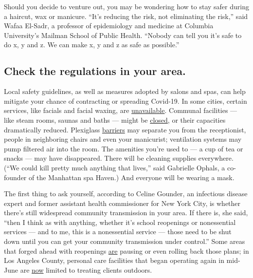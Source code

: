 Should you decide to venture out, you may be wondering how to stay safer
during a haircut, wax or manicure. ``It's reducing the risk, not
eliminating the risk,'' said Wafaa El-Sadr, a professor of epidemiology
and medicine at Columbia University's Mailman School of Public Health.
``Nobody can tell you it's safe to do x, y and z. We can make x, y and z
as safe as possible.''

\hypertarget{check-the-regulations-in-your-area}{%
\subsection{Check the regulations in your
area.}\label{check-the-regulations-in-your-area}}

Local safety guidelines, as well as measures adopted by salons and spas,
can help mitigate your chance of contracting or spreading Covid-19. In
some cities, certain services, like facials and facial waxing, are
\href{https://www.governor.ny.gov/sites/governor.ny.gov/files/atoms/files/Personal_Care_Summary_Guidelines.pdf}{unavailable}.
Communal facilities --- like steam rooms, saunas and baths --- might be
\href{https://www.northjersey.com/story/news/coronavirus/2020/06/12/nj-reopening-plan-spas-tanning-salons-can-reopen-june-22-murphy-says/3175833001/}{closed},
or their capacities dramatically reduced. Plexiglass
\href{https://www.cdc.gov/coronavirus/2019-ncov/community/organizations/nail-salon-employers.html}{barriers}
may separate you from the receptionist, people in neighboring chairs and
even your manicurist; ventilation systems may pump filtered air into the
room. The amenities you're used to --- a cup of tea or snacks --- may
have disappeared. There will be cleaning supplies everywhere. (``We
could kill pretty much anything that lives,'' said Gabrielle Ophals, a
co-founder of the Manhattan spa Haven.) And everyone will be wearing a
mask.

The first thing to ask yourself, according to Celine Gounder, an
infectious disease expert and former assistant health commissioner for
New York City, is whether there's still widespread community
transmission in your area. If there is, she said, ``then I think as with
anything, whether it's school reopenings or nonessential services ---
and to me, this is a nonessential service --- those need to be shut down
until you can get your community transmission under control.'' Some
areas that forged ahead with reopenings
\href{https://www.nytimes.com/interactive/2020/us/states-reopen-map-coronavirus.html}{are}
pausing or even rolling back those plans; in Los Angeles County,
personal care facilities that began operating again in mid-June are
\href{http://www.ph.lacounty.gov/media/Coronavirus/docs/protocols/Reopening_PersonalCare.pdf}{now}
limited to treating clients outdoors.

